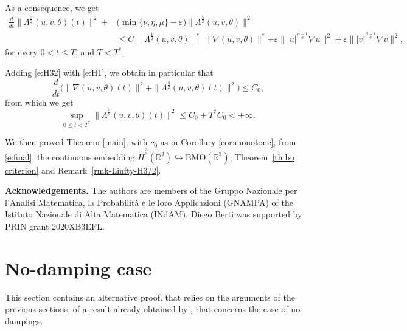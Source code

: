 \documentclass[a4paper]{article}
\begin{document}
As a consequence, we get
%
\begin{equation*} \label{e:H32}
  \begin{aligned}
    \frac{d}{dt} \|\Lambda^{\frac{3}{2}} (u, v, \theta) (t)
    \|^2 + & \big( \min\{\nu, \eta, \mu\} -
    \varepsilon\big)\|\Lambda^{\frac{5}{2}} (u, v, \theta)\|^2
    \\
    &\leq  C\,\|\Lambda^\frac12 (u, v, \theta)\|^*\, \|\nabla
    (u,v,\theta)\|^*
    {+ \varepsilon \||u|^\frac{\alpha-1}{2}\nabla
      u\|^2+\varepsilon\||v|^\frac{\beta-1}{2}\nabla v\|^2,}
  \end{aligned}
\end{equation*}
for every $0<t\leq T$, and $T<T^\ast$.
  
Adding \eqref{e:H32} with \eqref{e:H1}, we obtain in
particular that
%
\begin{equation*}
  \frac{d}{dt} \big(\|\nabla  (u,v,\theta)(t)\|^2 +\|\Lambda^{\frac32} (u,v,\theta)(t)\|^2\big) \le C_0,
\end{equation*}
from which we get
%
\begin{equation} \label{e:final}
  \sup_{0\leq t< T^*} \|\Lambda^{\frac32} (u,v,\theta)(t)\|^2 \le C_0 + T^*C_0 < + \infty.
\end{equation}
  
We then proved Theorem \ref{main}, with $c_0$ as in Corollary \ref{cor:monotone}, from \eqref{e:final}, the continuous embedding
    $\dot H^{\frac32}(\mathbb{R}^3)\hookrightarrow \mathrm{BMO}(\mathbb{R}^3)$,
Theorem~\ref{th:bu criterion} and Remark~\ref{rmk-Linfty-H3/2}. 

\medskip

\noindent\textbf{Acknowledgements.} The authors are
  members of the Gruppo Nazionale per l’Analisi Matematica, la
  Probabilità e le loro Applicazioni (GNAMPA) of the Istituto
  Nazionale di Alta Matematica (INdAM). Diego Berti was supported by
  PRIN grant 2020XB3EFL.  
  
  
\appendix
\section{No-damping case} \label{appendix}

This section contains an alternative proof, that relies on the
arguments of the previous sections, of a result already obtained by
\cite{Wang-Zhang-Pan}, that concerns the case of no dampings. 
\end{document}
